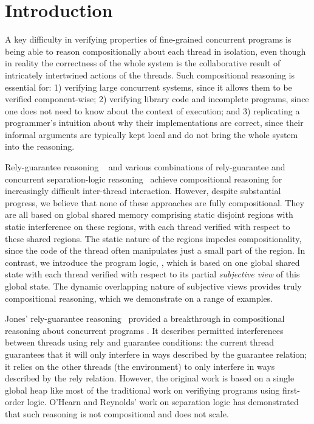 \section{Introduction}
\label{sec:introduction}



A key difficulty in verifying properties of fine-grained concurrent
programs is being able to reason compositionally about each thread in
isolation, even though in reality the correctness of the whole system
is the collaborative result of intricately intertwined actions of the
threads.  Such compositional reasoning is essential for: 1) verifying
large concurrent systems, since it allows them to be verified
component-wise; 2) verifying library code and incomplete programs,
since one does not need to know about the context of execution; and 3)
replicating a programmer's intuition about why their implementations
are correct, since their informal arguments are typically  kept local and do
not bring the whole system into the reasoning.


Rely-guarantee reasoning ~\cite{rg} and various combinations
of rely-guarantee and concurrent separation-logic
reasoning~\cite{viktor-marriage,dg,lrg,cap-ecoop10,icap,tada} 
achieve  compositional reasoning for 
increasingly difficult inter-thread interaction. However, despite substantial
progress, we believe that none of these approaches are fully compositional. They are all
based on global shared memory comprising static disjoint
regions with static interference on these regions, with each thread
verified with respect to these shared regions. The static nature
of the regions impedes compositionality, since the code of the thread
often manipulates just  a small part of the region. 
In contrast, we introduce  the program logic, \colosl,
which  is based on one global shared state 
with each thread verified with
respect to its partial {\em subjective view}  of this  global 
state. The dynamic overlapping nature of subjective views  provides truly
compositional reasoning, which we demonstrate on a range of
examples.





Jones' rely-guarantee  reasoning~\cite{.} provided a
breakthrough in compositional reasoning about concurrent programs . It
describes permitted interferences between threads using rely and
guarantee conditions: the current thread guarantees that it will only
interfere in ways described by the guarantee relation; it relies on
the other threads (the environment) to only interfere in ways
described by the rely relation. However, the original work is based on
a single global heap  like most of the traditional work on
verifiying programs using first-order logic. O'Hearn and Reynolds'
work on separation logic has demonstrated that such reasoning is not
compositional and does not scale. 



